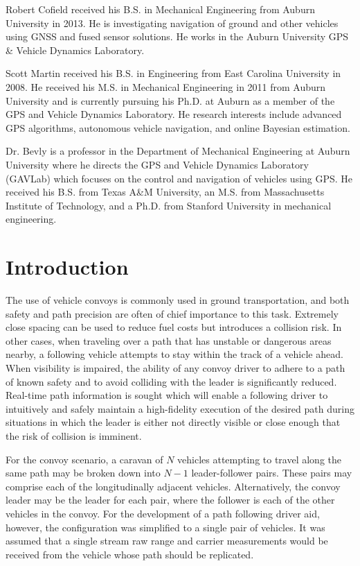 \documentclass[twocolumn,10pt]{article}
\begin{document}
  Robert Cofield received his B.S. in Mechanical Engineering from Auburn University in 2013. He is investigating navigation of ground and other vehicles using GNSS and fused sensor solutions.  He works in the Auburn University GPS \& Vehicle Dynamics Laboratory.

  Scott Martin received his B.S. in Engineering from East Carolina University in 2008. He received his M.S. in Mechanical Engineering in 2011 from Auburn University and is currently pursuing his Ph.D. at Auburn as a member of the GPS and Vehicle Dynamics Laboratory. He research interests include advanced GPS algorithms, autonomous vehicle navigation, and online Bayesian estimation. 

  Dr. Bevly is a professor in the Department of Mechanical Engineering at Auburn University where he directs the GPS and Vehicle Dynamics Laboratory (GAVLab) which focuses on the control and navigation of vehicles using GPS.  He received his B.S. from Texas A\&M University, an M.S. from Massachusetts Institute of Technology, and a Ph.D. from Stanford University in mechanical engineering. 


\section*{Introduction}

  The use of vehicle convoys is commonly used in ground transportation, and both safety and path precision are often of chief importance to this task.  Extremely close spacing can be used to reduce fuel costs but introduces a collision risk.  In other cases, when traveling over a path that has unstable or dangerous areas nearby, a following vehicle attempts to stay within the track of a vehicle ahead.  When visibility is impaired, the ability of any convoy driver to adhere to a path of known safety and to avoid colliding with the leader is significantly reduced.  Real-time path information is sought which will enable a following driver to intuitively and safely maintain a high-fidelity execution of the desired path during situations in which the leader is either not directly visible or close enough that the risk of collision is imminent.

  For the convoy scenario, a caravan of $N$ vehicles attempting to travel along the same path may be broken down into $N-1$ leader-follower pairs.  These pairs may comprise each of the longitudinally adjacent vehicles.  Alternatively, the convoy leader may be the leader for each pair, where the follower is each of the other vehicles in the convoy.  For the development of a path following driver aid, however, the configuration was simplified to a single pair of vehicles.  It was assumed that a single stream raw range and carrier measurements would be received from the vehicle whose path should be replicated.
\end{document}
